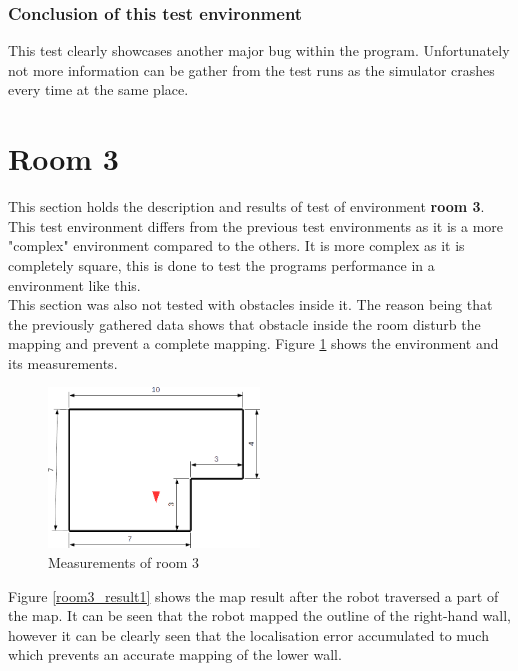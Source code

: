 \subsubsection{Conclusion of this test environment}
This test clearly showcases another major bug within the program. Unfortunately not more information can be gather from the test runs as the simulator crashes every time at the same place. 

\section{Room 3}
This section holds the description and results of test of environment \textbf{room 3}. \\
This test environment differs from the previous test environments as it is a more "complex" environment compared to the others. It is more complex as it is completely square, this is done to test the programs performance in a environment like this.\\
This section was also not tested with obstacles inside it. The reason being that the previously gathered data shows that obstacle inside the room disturb the mapping and prevent a complete mapping.
Figure \ref{room3_empty} shows the environment and its measurements. \\

\begin{figure}[h]
\centering
\includegraphics[width = 0.5\textwidth]{../../figures/room3_empty} 
\caption{Measurements of room 3}
\label{room3_empty}
\end{figure}

Figure \ref{room3_result1} shows the map result after the robot traversed a part of the map. It can be seen that the robot mapped the outline of the right-hand wall, however it can be clearly seen that the localisation error accumulated to much which prevents an accurate mapping of the lower wall. \\

